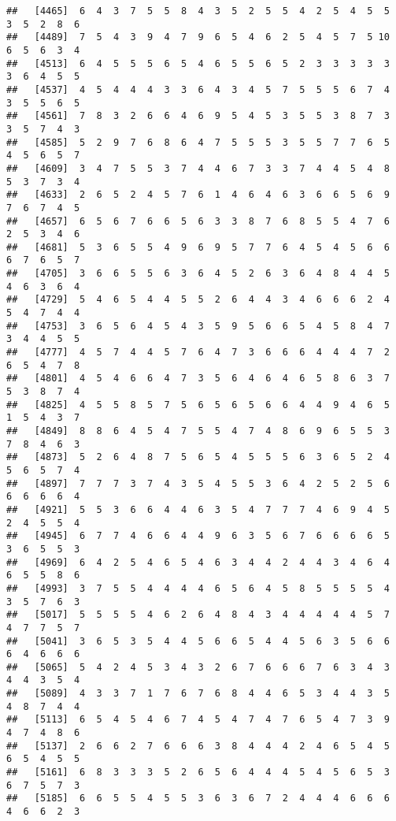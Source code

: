 \documentclass[
]{book}
\begin{document}
\begin{verbatim}
##   [4465]  6  4  3  7  5  5  8  4  3  5  2  5  5  4  2  5  4  5  5  3  5  2  8  6
##   [4489]  7  5  4  3  9  4  7  9  6  5  4  6  2  5  4  5  7  5 10  6  5  6  3  4
##   [4513]  6  4  5  5  5  6  5  4  6  5  5  6  5  2  3  3  3  3  3  3  6  4  5  5
##   [4537]  4  5  4  4  4  3  3  6  4  3  4  5  7  5  5  5  6  7  4  3  5  5  6  5
##   [4561]  7  8  3  2  6  6  4  6  9  5  4  5  3  5  5  3  8  7  3  3  5  7  4  3
##   [4585]  5  2  9  7  6  8  6  4  7  5  5  5  3  5  5  7  7  6  5  4  5  6  5  7
##   [4609]  3  4  7  5  5  3  7  4  4  6  7  3  3  7  4  4  5  4  8  5  3  7  3  4
##   [4633]  2  6  5  2  4  5  7  6  1  4  6  4  6  3  6  6  5  6  9  7  6  7  4  5
##   [4657]  6  5  6  7  6  6  5  6  3  3  8  7  6  8  5  5  4  7  6  2  5  3  4  6
##   [4681]  5  3  6  5  5  4  9  6  9  5  7  7  6  4  5  4  5  6  6  6  7  6  5  7
##   [4705]  3  6  6  5  5  6  3  6  4  5  2  6  3  6  4  8  4  4  5  4  6  3  6  4
##   [4729]  5  4  6  5  4  4  5  5  2  6  4  4  3  4  6  6  6  2  4  5  4  7  4  4
##   [4753]  3  6  5  6  4  5  4  3  5  9  5  6  6  5  4  5  8  4  7  3  4  4  5  5
##   [4777]  4  5  7  4  4  5  7  6  4  7  3  6  6  6  4  4  4  7  2  6  5  4  7  8
##   [4801]  4  5  4  6  6  4  7  3  5  6  4  6  4  6  5  8  6  3  7  5  3  8  7  4
##   [4825]  4  5  5  8  5  7  5  6  5  6  5  6  6  4  4  9  4  6  5  1  5  4  3  7
##   [4849]  8  8  6  4  5  4  7  5  5  4  7  4  8  6  9  6  5  5  3  7  8  4  6  3
##   [4873]  5  2  6  4  8  7  5  6  5  4  5  5  5  6  3  6  5  2  4  5  6  5  7  4
##   [4897]  7  7  7  3  7  4  3  5  4  5  5  3  6  4  2  5  2  5  6  6  6  6  6  4
##   [4921]  5  5  3  6  6  4  4  6  3  5  4  7  7  7  4  6  9  4  5  2  4  5  5  4
##   [4945]  6  7  7  4  6  6  4  4  9  6  3  5  6  7  6  6  6  6  5  3  6  5  5  3
##   [4969]  6  4  2  5  4  6  5  4  6  3  4  4  2  4  4  3  4  6  4  6  5  5  8  6
##   [4993]  3  7  5  5  4  4  4  4  6  5  6  4  5  8  5  5  5  5  4  3  5  7  6  3
##   [5017]  5  5  5  5  4  6  2  6  4  8  4  3  4  4  4  4  4  5  7  4  7  7  5  7
##   [5041]  3  6  5  3  5  4  4  5  6  6  5  4  4  5  6  3  5  6  6  6  4  6  6  6
##   [5065]  5  4  2  4  5  3  4  3  2  6  7  6  6  6  7  6  3  4  3  4  4  3  5  4
##   [5089]  4  3  3  7  1  7  6  7  6  8  4  4  6  5  3  4  4  3  5  4  8  7  4  4
##   [5113]  6  5  4  5  4  6  7  4  5  4  7  4  7  6  5  4  7  3  9  4  7  4  8  6
##   [5137]  2  6  6  2  7  6  6  6  3  8  4  4  4  2  4  6  5  4  5  6  5  4  5  5
##   [5161]  6  8  3  3  3  5  2  6  5  6  4  4  4  5  4  5  6  5  3  6  7  5  7  3
##   [5185]  6  6  5  5  4  5  5  3  6  3  6  7  2  4  4  4  6  6  6  4  6  6  2  3

\end{verbatim}
\end{document}
